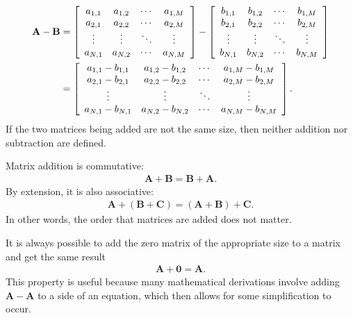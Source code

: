 \begin{align}
  \mathbf{A} - \mathbf{B} &= 
    \left[ \begin{array}{c c c c} a_{1,1} & a_{1,2} & \cdots & a_{1,M} \\
  		  						  a_{2,1} & a_{2,2} & \cdots & a_{2,M} \\
		  						  \vdots  & \vdots  & \ddots & \vdots  \\
								  a_{N,1} & a_{N,2} & \cdots & a_{N,M} \\ \end{array} \right]
  -	\left[ \begin{array}{c c c c} b_{1,1} & b_{1,2} & \cdots & b_{1,M} \\
  		  						  b_{2,1} & b_{2,2} & \cdots & b_{2,M} \\
		  						  \vdots  & \vdots  & \ddots & \vdots  \\
								  b_{N,1} & b_{N,2} & \cdots & b_{N,M} \\ \end{array} \right] \nonumber	\\		
  &= \left[ \begin{array}{c c c c} a_{1,1} - b_{1,1} & a_{1,2} - b_{1,2} & \cdots & a_{1,M} - b_{1,M} \\
  		  						   a_{2,1} - b_{2,1} & a_{2,2} - b_{2,2} & \cdots & a_{2,M} - b_{2,M} \\
		  						   \vdots  & \vdots  & \ddots & \vdots  \\
								   a_{N,1} - b_{N,1} & a_{N,2} - b_{N,2} & \cdots & a_{N,M} - b_{N,M} \\ \end{array} \right] .
\end{align}
If the two matrices being added are not the same size, then neither addition nor subtraction are defined.

Matrix addition is commutative:
\begin{align}
  \mathbf{A} + \mathbf{B} = \mathbf{B} + \mathbf{A}.
\end{align}
By extension, it is also associative:
\begin{align}
  \mathbf{A} + ( \mathbf{B} + \mathbf{C} ) = ( \mathbf{A} + \mathbf{B} ) + \mathbf{C} .
\end{align}
In other words, the order that matrices are added does not matter.

It is always possible to add the zero matrix of the appropriate size to a matrix and get the same result
\begin{align}
  \mathbf{A} + \mathbf{0} = \mathbf{A} .
\end{align}
This property is useful because many mathematical derivations involve adding $\mathbf{A} - \mathbf{A}$ to a side of an equation, which then allows for some simplification to occur.

